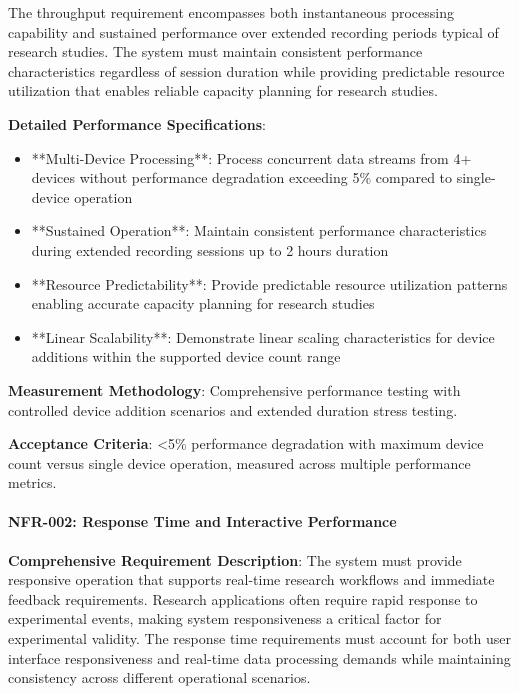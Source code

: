 \documentclass[12pt,a4paper]{report}
\begin{document}
The throughput requirement encompasses both instantaneous processing capability and sustained performance over extended
recording periods typical of research studies. The system must maintain consistent performance characteristics
regardless of session duration while providing predictable resource utilization that enables reliable capacity planning
for research studies.

\textbf{Detailed Performance Specifications}:

\begin{itemize}
\item **Multi-Device Processing**: Process concurrent data streams from 4+ devices without performance degradation exceeding
  5\% compared to single-device operation
\item **Sustained Operation**: Maintain consistent performance characteristics during extended recording sessions up to 2
  hours duration
\item **Resource Predictability**: Provide predictable resource utilization patterns enabling accurate capacity planning for
  research studies
\item **Linear Scalability**: Demonstrate linear scaling characteristics for device additions within the supported device
  count range

\end{itemize}
\textbf{Measurement Methodology}: Comprehensive performance testing with controlled device addition scenarios and extended
duration stress testing.

\textbf{Acceptance Criteria}: <5\% performance degradation with maximum device count versus single device operation, measured
across multiple performance metrics.

\paragraph{NFR-002: Response Time and Interactive Performance}

\textbf{Comprehensive Requirement Description}: The system must provide responsive operation that supports real-time research
workflows and immediate feedback requirements. Research applications often require rapid response to experimental
events, making system responsiveness a critical factor for experimental validity. The response time requirements must
account for both user interface responsiveness and real-time data processing demands while maintaining consistency
across different operational scenarios.
\end{document}
